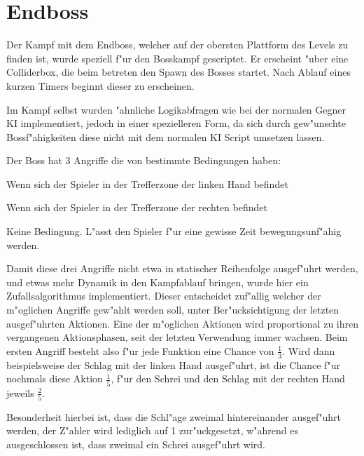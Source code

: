 \chapter{Endboss}
Der Kampf mit dem Endboss, welcher auf der obersten Plattform des Levels zu finden ist, wurde speziell f"ur den Bosskampf gescriptet.
Er erscheint "uber eine Colliderbox, die beim betreten den Spawn des Bosses startet. Nach Ablauf eines kurzen Timers beginnt dieser zu erscheinen.\newline

Im Kampf selbst wurden "ahnliche Logikabfragen wie bei der normalen Gegner KI implementiert, jedoch in einer spezielleren Form, da sich durch gew"unschte Bossf"ahigkeiten diese nicht mit dem normalen KI Script umsetzen lassen.

Der Boss hat 3 Angriffe die von bestimmte Bedingungen haben:
\begin{description}[align=left]
	\item[\textbf{Schlag mit linker Hand}]
	Wenn sich der Spieler in der Trefferzone der linken Hand befindet\newline
	\item[\textbf{Schlag mit rechter Hand}]
	 Wenn sich der Spieler in der Trefferzone der rechten befindet\newline
	\item[\textbf{Schreien}]
	 Keine Bedingung. L"asst den Spieler f"ur eine gewisse Zeit bewegungsunf"ahig werden.
\end{description}

Damit diese drei Angriffe nicht etwa in statischer Reihenfolge ausgef"uhrt werden, und etwas mehr Dynamik in den Kampfablauf bringen, wurde hier ein Zufallsalgorithmus implementiert.
Dieser entscheidet zuf"allig welcher der m"oglichen Angriffe gew"ahlt werden soll, unter Ber"ucksichtigung der letzten ausgef"uhrten Aktionen.
Eine der m"oglichen Aktionen wird proportional zu ihren vergangenen Aktionsphasen, seit der letzten Verwendung immer wachsen.
Beim ersten Angriff besteht also f"ur jede Funktion eine Chance von $\frac{1}{3}$.
Wird dann beispielsweise der Schlag mit der linken Hand ausgef"uhrt, ist die Chance f"ur nochmals diese Aktion $\frac{1}{5}$, f"ur den Schrei und den Schlag mit der rechten Hand jeweils $\frac{2}{5}$.\newline

Besonderheit hierbei ist, dass die Schl"age zweimal hintereinander ausgef"uhrt werden, der Z"ahler wird lediglich auf 1 zur"uckgesetzt, w"ahrend es ausgeschlossen ist, dass zweimal ein Schrei ausgef"uhrt wird.

